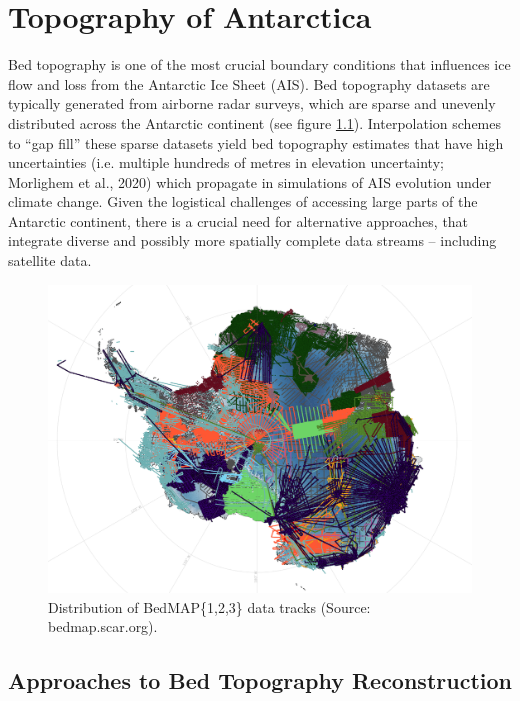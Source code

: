\chapter{Topography of Antarctica}\label{review}

Bed topography is one of the most crucial boundary conditions that influences ice flow and loss from the Antarctic Ice Sheet (AIS)\cite{Morlighem_2020}. Bed topography datasets are typically generated from airborne radar surveys, which are sparse and unevenly distributed across the Antarctic continent (see figure \ref{fig:BedMAP}). Interpolation schemes to ``gap fill'' these sparse datasets yield bed topography estimates that have high uncertainties (i.e. multiple hundreds of metres in elevation uncertainty; Morlighem et al., 2020) which propagate in simulations of AIS evolution under climate change\cite{Castleman_2022}. Given the logistical challenges of accessing large parts of the Antarctic continent, there is a crucial need for alternative approaches, that integrate diverse and possibly more spatially complete data streams – including satellite data.
\begin{figure}[H] %
    \includegraphics[scale=0.4]{bedmap.png}
    \caption{Distribution of BedMAP\{1,2,3\} data tracks (Source: bedmap.scar.org).}
    \label{fig:BedMAP}
\end{figure}

\section{Approaches to Bed Topography Reconstruction}

